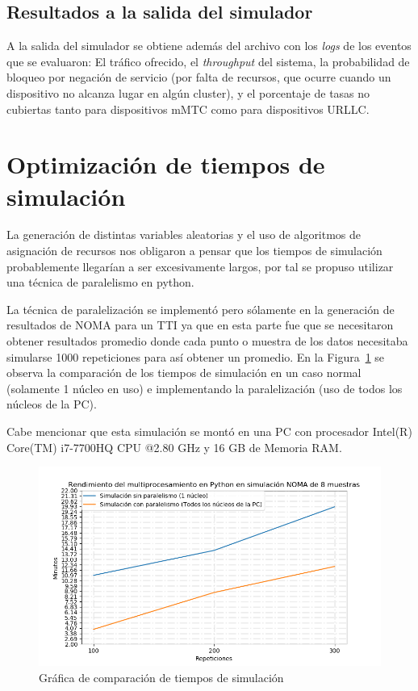 \subsection{Resultados a la salida del simulador}

A la salida del simulador se obtiene además del archivo con los \textit{logs} de los eventos que se evaluaron: El tráfico ofrecido, el \textit{throughput} del sistema, la probabilidad de bloqueo por negación de servicio (por falta de recursos, que ocurre cuando un dispositivo no alcanza lugar en algún cluster), y el porcentaje de tasas no cubiertas tanto para dispositivos mMTC como para dispositivos URLLC.

\hfill

\break


\section{Optimización de tiempos de simulación}

La generación de distintas variables aleatorias y el uso de algoritmos de asignación de recursos nos obligaron a pensar que los tiempos de simulación probablemente llegarían a ser excesivamente largos, por tal se propuso utilizar una técnica de paralelismo en python.\newline

La técnica de paralelización se implementó pero sólamente en la generación de resultados de NOMA para un TTI ya que en esta parte fue que se necesitaron obtener resultados promedio donde cada punto o muestra de los datos necesitaba simularse 1000 repeticiones para así obtener un promedio. En la Figura~\ref{fig:SIMmultiprocessing} se observa la comparación de los tiempos de simulación en un caso normal (solamente 1 núcleo en uso) e implementando la paralelización (uso de todos los núcleos de la PC).\newline

Cabe mencionar que esta simulación se montó en una PC con procesador Intel(R) Core(TM) i7-7700HQ CPU @2.80 GHz y 16 GB de Memoria RAM.

\begin{figure}[th]
    \centering
    \includegraphics[scale=.7]{Figures/MultiprocesamientoSIM.png}
    \decoRule
    \caption[Gráfica de comparación de tiempos de simulación]{Gráfica de comparación de tiempos de simulación}
    \label{fig:SIMmultiprocessing}
\end{figure}